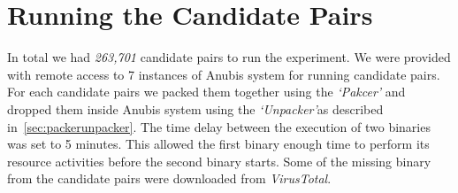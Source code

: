 \section{Running the Candidate Pairs}
\label{sec:Running the Candidate Pairs}
In total we had \emph{263,701} candidate pairs to run the experiment.
We were provided with remote access to 7 instances of Anubis system for running candidate pairs.
For each candidate pairs we packed them together using the \emph{`Pakcer'} and dropped them inside Anubis system using the \emph{`Unpacker'}as described in~\ref{sec:packerunpacker}.
The time delay between the execution of two binaries was set to 5 minutes.
This allowed the first binary enough time to perform its resource activities before the second binary starts.
Some of the missing binary from the candidate pairs were downloaded from \emph{VirusTotal}.

